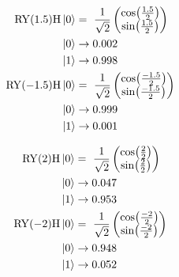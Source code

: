 \begin{equation}
    \centering
    \begin{split}
        \mathrm{RY}(1.5)\mathrm{H}\ket{0} &=\ \frac{1}{\sqrt{2}}\begin{pmatrix}\cos(\frac{1.5}{2}) \\ \sin(\frac{1.5}{2})\end{pmatrix}\\
        \ket{0} &\to 0.002 \\
        \ket{1} &\to 0.998 \\
        \mathrm{RY}(-1.5)\mathrm{H}\ket{0} &=\ \frac{1}{\sqrt{2}}\begin{pmatrix}\cos(\frac{-1.5}{2}) \\ \sin(\frac{-1.5}{2})\end{pmatrix}\\
        \ket{0} &\to 0.999 \\
        \ket{1} &\to 0.001 \\
    \end{split}
    \label{equation:normalization_range_1_5}
\end{equation}

\begin{equation}
    \centering
    \begin{split}
        \mathrm{RY}(2)\mathrm{H}\ket{0} &=\ \frac{1}{\sqrt{2}}\begin{pmatrix}\cos(\frac{2}{2}) \\ \sin(\frac{2}{2})\end{pmatrix}\\
        \ket{0} &\to 0.047 \\
        \ket{1} &\to 0.953 \\
        \mathrm{RY}(-2)\mathrm{H}\ket{0} &=\ \frac{1}{\sqrt{2}}\begin{pmatrix}\cos(\frac{-2}{2}) \\ \sin(\frac{-2}{2})\end{pmatrix}\\
        \ket{0} &\to 0.948 \\
        \ket{1} &\to 0.052 \\
    \end{split}
    \label{equation:normalization_range_2}
\end{equation}

